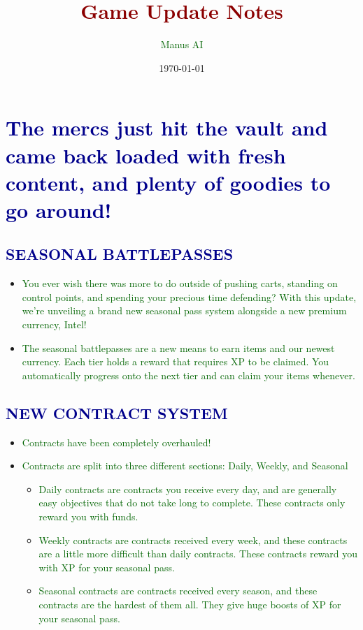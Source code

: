 \documentclass{article}
\title{\textcolor{darkred}{Game Update Notes}}
\author{\textcolor{darkgreen}{Manus AI}}
\date{\today}
\begin{document}
\maketitle

\section*{\textcolor{darkblue}{The mercs just hit the vault and came back loaded with fresh content, and plenty of goodies to go around!}}




\subsection*{\textcolor{darkblue}{SEASONAL BATTLEPASSES}}

\begin{itemize}
    \item \textcolor{darkgreen}{You ever wish there was more to do outside of pushing carts, standing on control points, and spending your precious time defending? With this update, we’re unveiling a brand new seasonal pass system alongside a new premium currency, Intel!}
    \item \textcolor{darkgreen}{The seasonal battlepasses are a new means to earn items and our newest currency. Each tier holds a reward that requires XP to be claimed. You automatically progress onto the next tier and can claim your items whenever.}
\end{itemize}




\subsection*{\textcolor{darkblue}{NEW CONTRACT SYSTEM}}

\begin{itemize}
    \item \textcolor{darkgreen}{Contracts have been completely overhauled!}
    \item \textcolor{darkgreen}{Contracts are split into three different sections: Daily, Weekly, and Seasonal}
    \begin{itemize}
        \item \textcolor{darkgreen}{Daily contracts are contracts you receive every day, and are generally easy objectives that do not take long to complete. These contracts only reward you with funds.}
        \item \textcolor{darkgreen}{Weekly contracts are contracts received every week, and these contracts are a little more difficult than daily contracts. These contracts reward you with XP for your seasonal pass.}
        \item \textcolor{darkgreen}{Seasonal contracts are contracts received every season, and these contracts are the hardest of them all. They give huge boosts of XP for your seasonal pass.}
    \end{itemize}
\end{itemize}
\end{document}
